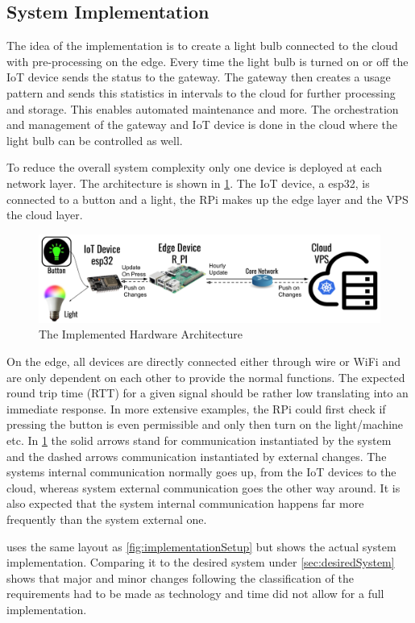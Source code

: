 \subsection{System Implementation}
The idea of the implementation is to create a light bulb connected to the cloud with pre-processing on the edge. Every time the light bulb is turned on or off the IoT device sends the status to the gateway. The gateway then creates a usage pattern and sends this statistics in intervals to the cloud for further processing and storage. This enables automated maintenance and more. The orchestration and management of the gateway and IoT device is done in the cloud where the light bulb can be controlled as well.

To reduce the overall system complexity only one device is deployed at each network layer. The architecture is shown in \cref{fig:actualSetup}. The IoT device, a esp32, is connected to a button and a light, the RPi makes up the edge layer and the VPS the cloud layer.
\begin{figure}[!ht]
    \centering
    \includegraphics[width=\textwidth]{figures/actualSetup.png}
    \caption{The Implemented Hardware Architecture}
    \label{fig:actualSetup}
\end{figure}
On the edge, all devices are directly connected either through wire or WiFi and are only dependent on each other to provide the normal functions. The expected round trip time (RTT) for a given signal should be rather low translating into an immediate response. In more extensive examples, the RPi could first check if pressing the button is even permissible and only then turn on the light/machine etc. In \cref{fig:actualSetup} the solid arrows stand for communication instantiated by the system and the dashed arrows communication instantiated by external changes. The systems internal communication normally goes up, from the IoT devices to the cloud, whereas system external communication goes the other way around. It is also expected that the system internal communication happens far more frequently than the system external one.

 uses the same layout as \cref{fig:implementationSetup} but shows the actual system implementation. Comparing it to the desired system under \cref{sec:desiredSystem} shows that major and minor changes following the classification of the requirements had to be made as technology and time did not allow for a full implementation.

